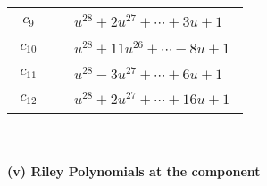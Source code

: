 \documentclass[1p]{elsarticle_modified}
\theoremstyle{definition}
\begin{document}
\begin{tabular}{m{50pt}|m{274pt}}
\hline $$\begin{aligned}c_{9}\end{aligned}$$&$\begin{aligned}
&u^{28}+2 u^{27}+\cdots+3 u+1
\end{aligned}$\\
\hline $$\begin{aligned}c_{10}\end{aligned}$$&$\begin{aligned}
&u^{28}+11 u^{26}+\cdots-8 u+1
\end{aligned}$\\
\hline $$\begin{aligned}c_{11}\end{aligned}$$&$\begin{aligned}
&u^{28}-3 u^{27}+\cdots+6 u+1
\end{aligned}$\\
\hline $$\begin{aligned}c_{12}\end{aligned}$$&$\begin{aligned}
&u^{28}+2 u^{27}+\cdots+16 u+1
\end{aligned}$\\
\hline
\end{tabular}\\~\\
\newpage\renewcommand{\arraystretch}{1}
\flushleft \textbf{(v) Riley Polynomials at the component}\newline \\
\end{document}
